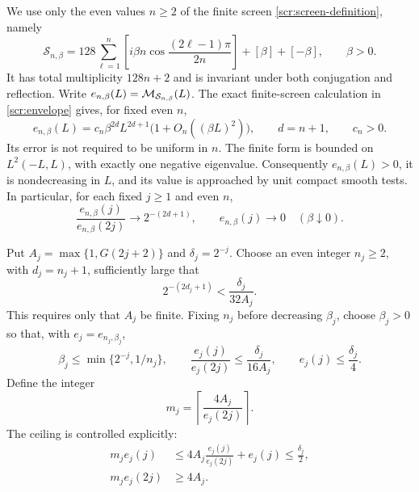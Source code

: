 We use only the even values \(n\ge2\) of the finite screen
\eqref{scr:screen-definition}, namely
\[
 \mathcal S_{n,\beta}
 =128\sum_{\ell=1}^{n}
   \left[i\beta n\cos\frac{(2\ell-1)\pi}{2n}\right]
       +[\beta]+[-\beta],\qquad \beta>0.
\]
It has total multiplicity \(128n+2\) and is invariant under
both conjugation and reflection. Write
\(e_{n,\beta}(L)=\mathcal M_{\mathcal S_{n,\beta}}(L)\).
The exact finite-screen calculation in
\eqref{scr:envelope} gives, for fixed even \(n\),
\begin{equation}\label{arb:screen-input}
 e_{n,\beta}(L)
   =c_n\beta^{2d}L^{2d+1}
       \bigl(1+O_n((\beta L)^2)\bigr),\qquad
 d=n+1,\qquad c_n>0.
\end{equation}
Its error is not required to be uniform in \(n\).
The finite form is bounded on \(L^2(-L,L)\), with exactly
one negative eigenvalue. Consequently \(e_{n,\beta}(L)>0\),
it is nondecreasing in \(L\), and its value is approached by
unit compact smooth tests. In particular, for each fixed
\(j\ge1\) and even \(n\),
\begin{equation}\label{arb:radius-ratio}
 \frac{e_{n,\beta}(j)}{e_{n,\beta}(2j)}
       \longrightarrow2^{-(2d+1)},\qquad
 e_{n,\beta}(j)\longrightarrow0
       \quad(\beta\downarrow0).
\end{equation}

Put \(A_j=\max\{1,G(2j+2)\}\) and
\(\delta_j=2^{-j}\). Choose an even integer \(n_j\ge2\),
with \(d_j=n_j+1\), sufficiently large that
\begin{equation}\label{arb:degree-choice}
 2^{-(2d_j+1)}<\frac{\delta_j}{32A_j}.
\end{equation}
This requires only that \(A_j\) be finite. Fixing \(n_j\)
before decreasing \(\beta_j\), choose \(\beta_j>0\) so that,
with \(e_j=e_{n_j,\beta_j}\),
\begin{equation}\label{arb:displacement-choice}
 \beta_j\le\min\{2^{-j},1/n_j\},\qquad
 \frac{e_j(j)}{e_j(2j)}\le\frac{\delta_j}{16A_j},\qquad
 e_j(j)\le\frac{\delta_j}{4}.
\end{equation}
Define the integer
\begin{equation}\label{arb:multiplicity}
 m_j=\left\lceil\frac{4A_j}{e_j(2j)}\right\rceil.
\end{equation}
The ceiling is controlled explicitly:
\begin{equation}\label{arb:two-budgets}
 \begin{split}
 m_je_j(j)
 &\le4A_j\frac{e_j(j)}{e_j(2j)}+e_j(j)
   \le\frac{\delta_j}{2},\\
 m_je_j(2j)&\ge4A_j.
 \end{split}
\end{equation}

